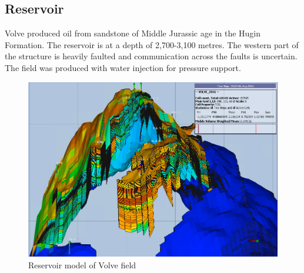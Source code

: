 \documentclass[12pt,a4paper]{report}
\begin{document}
\subsection{Reservoir}
Volve produced oil from sandstone of Middle Jurassic age in the Hugin Formation. The reservoir is at a depth of 2,700-3,100 metres. The western part of the structure is heavily faulted and communication across the faults is uncertain.
The field was produced with water injection for pressure support.
\begin{figure}[H]
\centering
\includegraphics[width=1.0\textwidth]{Volve/0.png}
\caption{Reservoir model of Volve field}
\end{figure}
\end{document}
